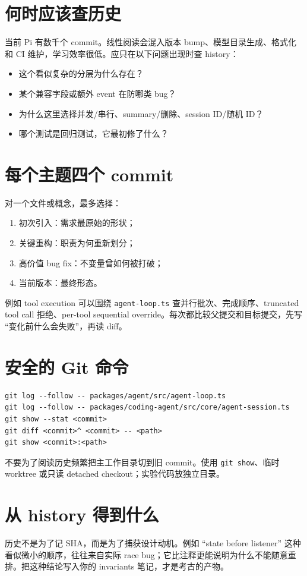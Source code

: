 \documentclass[UTF8,openany,11pt]{ctexbook}
\newcommand{\pathref}[1]{\texttt{#1}}
\begin{document}
\section{何时应该查历史}
当前 Pi 有数千个 commit。线性阅读会混入版本 bump、模型目录生成、格式化和 CI 维护，学习效率很低。应只在以下问题出现时查 history：
\begin{itemize}
\item 这个看似复杂的分层为什么存在？
\item 某个兼容字段或额外 event 在防哪类 bug？
\item 为什么这里选择并发/串行、summary/删除、session ID/随机 ID？
\item 哪个测试是回归测试，它最初修了什么？
\end{itemize}

\section{每个主题四个 commit}
对一个文件或概念，最多选择：
\begin{enumerate}
\item 初次引入：需求最原始的形状；
\item 关键重构：职责为何重新划分；
\item 高价值 bug fix：不变量曾如何被打破；
\item 当前版本：最终形态。
\end{enumerate}

例如 tool execution 可以围绕 \pathref{agent-loop.ts} 查并行批次、完成顺序、truncated tool call 拒绝、per-tool sequential override。每次都比较父提交和目标提交，先写 ``变化前什么会失败''，再读 diff。

\section{安全的 Git 命令}
\begin{Verbatim}[fontsize=\small]
git log --follow -- packages/agent/src/agent-loop.ts
git log --follow -- packages/coding-agent/src/core/agent-session.ts
git show --stat <commit>
git diff <commit>^ <commit> -- <path>
git show <commit>:<path>
\end{Verbatim}
不要为了阅读历史频繁把主工作目录切到旧 commit。使用 \texttt{git show}、临时 worktree 或只读 detached checkout；实验代码放独立目录。

\section{从 history 得到什么}
历史不是为了记 SHA，而是为了捕获设计动机。例如 ``state before listener'' 这种看似微小的顺序，往往来自实际 race bug；它比注释更能说明为什么不能随意重排。把这种结论写入你的 invariants 笔记，才是考古的产物。
\end{document}
